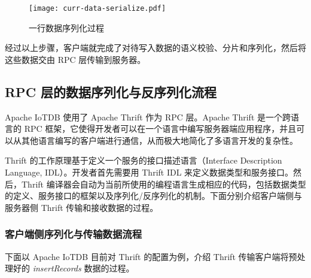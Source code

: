 \begin{figure}
  \centering
  \texttt{[image: curr-data-serialize.pdf]}
  \caption{一行数据序列化过程}
  \label{fig:curr-line-serialize-format}
\end{figure}

经过以上步骤，客户端就完成了对待写入数据的语义校验、分片和序列化，然后将这些数据交由 RPC 层传输到服务器。
\subsection{RPC 层的数据序列化与反序列化流程}
Apache IoTDB 使用了 Apache Thrift\cite{apache2024thrift} 作为 RPC 层。Apache Thrift 是一个跨语言的 RPC 框架，它使得开发者可以在一个语言中编写服务器端应用程序，并且可以从其他语言编写的客户端进行通信，从而极大地简化了多语言开发的复杂性。

Thrift 的工作原理基于定义一个服务的接口描述语言（Interface Description Language, IDL）。开发者首先需要用 Thrift IDL 来定义数据类型和服务接口。然后，Thrift 编译器会自动为当前所使用的编程语言生成相应的代码，包括数据类型的定义、服务接口的框架以及序列化/反序列化的机制。下面分别介绍客户端侧与服务器侧 Thrift 传输和接收数据的过程。
\subsubsection{客户端侧序列化与传输数据流程\label{sec:chap3-sec2-2-1}}
下面以 Apache IoTDB 目前对 Thrift 的配置为例，介绍 Thrift 传输客户端将预处理好的 \emph{insertRecords} 数据的过程。

